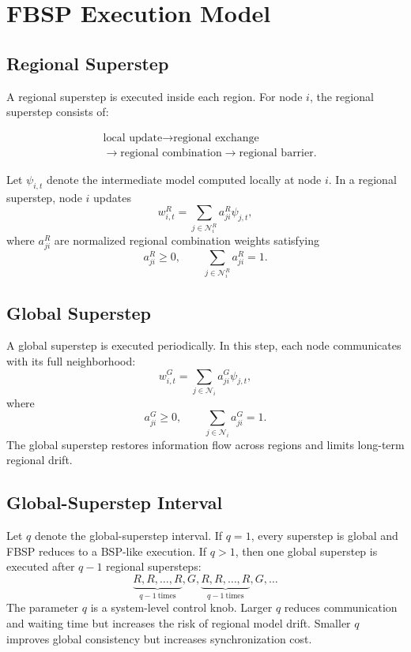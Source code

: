 ﻿\documentclass[10pt,journal]{IEEEtran}
\begin{document}
	\section{FBSP Execution Model}
	
	\subsection{Regional Superstep}
	
	A regional superstep is executed inside each region. For node $i$, the regional superstep consists of:
	
	\[
	\begin{aligned}
	&\text{local update} \rightarrow \text{regional exchange}\\
	&\rightarrow \text{regional combination} \rightarrow \text{regional barrier}.
	\end{aligned}
	\]
	
	Let $\psi_{i,t}$ denote the intermediate model computed locally at node $i$. In a regional superstep, node $i$ updates
	\[
	w_{i,t}^{R}
	=
	\sum_{j\in \mathcal{N}_i^R} a_{ji}^{R}\psi_{j,t},
	\]
	where $a_{ji}^{R}$ are normalized regional combination weights satisfying
	\[
	a_{ji}^{R}\geq 0,\qquad
	\sum_{j\in \mathcal{N}_i^R}a_{ji}^{R}=1.
	\]
	
	\subsection{Global Superstep}
	
	A global superstep is executed periodically. In this step, each node communicates with its full neighborhood:
	\[
	w_{i,t}^{G}
	=
	\sum_{j\in \mathcal{N}_i} a_{ji}^{G}\psi_{j,t},
	\]
	where
	\[
	a_{ji}^{G}\geq 0,\qquad
	\sum_{j\in \mathcal{N}_i}a_{ji}^{G}=1.
	\]
	The global superstep restores information flow across regions and limits long-term regional drift.
	
	\subsection{Global-Superstep Interval}
	
	Let $q$ denote the global-superstep interval. If $q=1$, every superstep is global and FBSP reduces to a BSP-like execution. If $q>1$, then one global superstep is executed after $q-1$ regional supersteps:
	\[
	\underbrace{R,R,\ldots,R}_{q-1\ \text{times}},G,
	\underbrace{R,R,\ldots,R}_{q-1\ \text{times}},G,\ldots
	\]
	The parameter $q$ is a system-level control knob. Larger $q$ reduces communication and waiting time but increases the risk of regional model drift. Smaller $q$ improves global consistency but increases synchronization cost.
	
\end{document}

